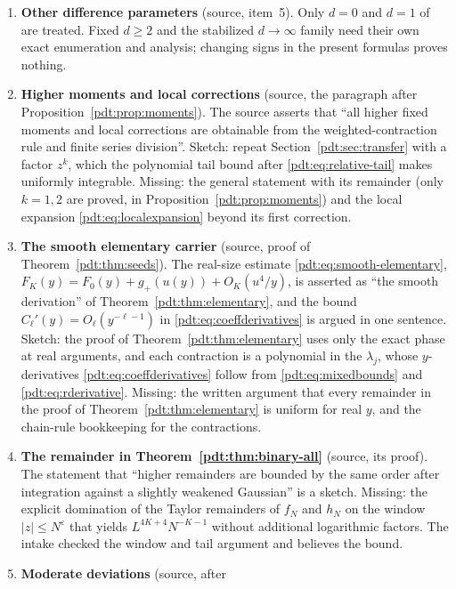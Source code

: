 \begin{enumerate}
\item\label{pdt:q:difference} \textbf{Other difference parameters}
 (source, item~5). Only $d=0$ and $d=1$ of~\cite{ccs} are treated. Fixed
 $d\ge2$ and the stabilized $d\to\infty$ family need their own exact
 enumeration and analysis; changing signs in the present formulas proves
 nothing.
\item\label{pdt:q:moments} \textbf{Higher moments and local corrections}
 (source, the paragraph after Proposition~\ref{pdt:prop:moments}). The
 source asserts that ``all higher fixed moments and local corrections are
 obtainable from the weighted-contraction rule and finite series
 division''. Sketch: repeat Section~\ref{pdt:sec:transfer} with a factor
 $z^k$, which the polynomial tail bound after \eqref{pdt:eq:relative-tail}
 makes uniformly integrable. Missing: the general statement with its
 remainder (only $k=1,2$ are proved, in
 Proposition~\ref{pdt:prop:moments}) and the local expansion
 \eqref{pdt:eq:localexpansion} beyond its first correction.
\item\label{pdt:q:smooth} \textbf{The smooth elementary carrier}
 (source, proof of Theorem~\ref{pdt:thm:seeds}). The real-size estimate
 \eqref{pdt:eq:smooth-elementary},
 $F_K(y)=F_0(y)+g_+(u(y))+O_K(u^4/y)$, is asserted as ``the smooth
 derivation'' of Theorem~\ref{pdt:thm:elementary}, and the bound
 $C_\ell'(y)=O_\ell(y^{-\ell-1})$ in \eqref{pdt:eq:coeffderivatives} is
 argued in one sentence. Sketch: the proof of
 Theorem~\ref{pdt:thm:elementary} uses only the exact phase at real
 arguments, and each contraction is a polynomial in the $\lambda_j$, whose
 $y$-derivatives \eqref{pdt:eq:coeffderivatives} follow from
 \eqref{pdt:eq:mixedbounds} and \eqref{pdt:eq:rderivative}. Missing: the
 written argument that every remainder in the proof of
 Theorem~\ref{pdt:thm:elementary} is uniform for real $y$, and the
 chain-rule bookkeeping for the contractions.
\item\label{pdt:q:binaryremainder} \textbf{The remainder in
 Theorem~\ref{pdt:thm:binary-all}} (source, its proof). The statement
 that ``higher remainders are bounded by the same order after integration
 against a slightly weakened Gaussian'' is a sketch. Missing: the explicit
 domination of the Taylor remainders of $f_N$ and $h_N$ on the window
 $|z|\le N^\varepsilon$ that yields $L^{4K+4}N^{-K-1}$ without additional
 logarithmic factors. The intake checked the window and tail argument and
 believes the bound.
\item\label{pdt:q:moderate} \textbf{Moderate deviations} (source, after

\end{enumerate}
